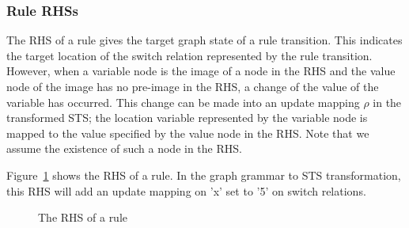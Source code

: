 \subsubsection{Rule RHSs}
The RHS of a rule gives the target graph state of a rule transition. This indicates the target location of the switch relation represented by the rule transition. However, when a variable node is the image of a node in the RHS and the value node of the image has no pre-image in the RHS, a change of the value of the variable has occurred. This change can be made into an update mapping $\rho$ in the transformed STS; the location variable represented by the variable node is mapped to the value specified by the value node in the RHS. Note that we assume the existence of such a node in the RHS.

Figure~\ref{fig:rhs_trafo} shows the RHS of a rule. In the graph grammar to STS transformation, this RHS will add an update mapping on 'x' set to '5' on switch relations.

\begin{figure}[ht]
  \begin{center}
    
  \end{center}
  \caption{The RHS of a rule}
  \label{fig:rhs_trafo}
\end{figure}
